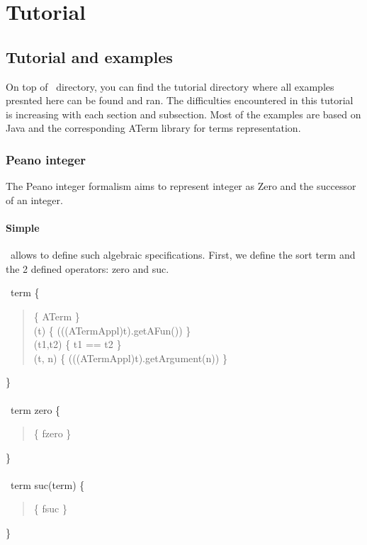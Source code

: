 \part{Tutorial}
\chapter{Tutorial and examples}

On top of \TOM\ directory, you can find the tutorial directory where
all examples presnted here can be found and ran.
The difficulties encountered in this tutorial is increasing with each
section and subsection. Most of the examples are based on Java and the
corresponding ATerm library for terms representation.

\section{Peano integer}
The Peano integer formalism aims to represent integer as Zero and the
successor of an integer.
\subsection{Simple}
\TOM\ allows to define such algebraic specifications. First, we define
the sort term and the 2 defined operators: zero and suc.

\typeterm\ term \{\\
\begin{quote}
 \implement           \{ ATerm \}\\
 \getfs(t)      \{ (((ATermAppl)t).getAFun()) \}\\
 \cmpfs(t1,t2)  \{ t1 == t2 \}\\
 \gets(t, n)   \{ (((ATermAppl)t).getArgument(n)) \}\\
\end{quote}
\}\\
\\
\op\ term zero \{\\
\begin{quote}
\fsym \{ fzero \}\\
\end{quote}
\}\\
\\
\op\ term suc(term) \{\\
\begin{quote}
  \fsym \{ fsuc \}\\
\end{quote}
\}\\


